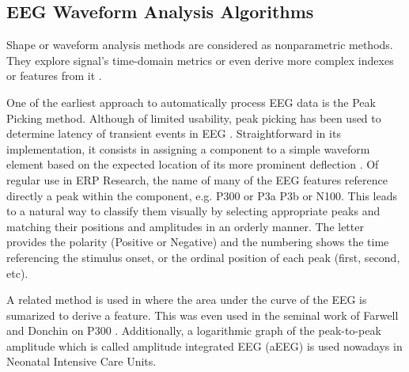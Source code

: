 \documentclass[brainsci,article,submit,moreauthors,pdftex,10pt,a4paper]{mdpi}
\begin{document}
\subsection{EEG Waveform Analysis Algorithms}
\label{Algorithms}

Shape or waveform analysis methods are considered as nonparametric methods.  They explore signal's time-domain metrics or even derive more complex indexes or features from it \citep{Thakor2009}. 

One of the earliest approach to automatically process EEG data is the Peak Picking method.  Although of limited usability, peak picking has been used to determine latency of transient events in EEG \citep{Jaskowski2000,Zhang2011}.  Straightforward in its implementation, it consists in assigning a component to a simple waveform element based on the expected location of its more prominent deflection \citep{Ouyang2017}.  
Of regular use in ERP Research, the name of many of the EEG features reference directly a peak within the component, e.g. P300 or P3a P3b or N100.  This leads to a natural way to classify them visually by selecting appropriate peaks and matching their positions and amplitudes in an orderly manner.  The letter provides the polarity (Positive or Negative) and the numbering shows the time referencing the stimulus onset, or the ordinal position of each peak (first, second, etc). 


A related method is used in \citep{Alvarado-Gonzalez2016} where the area under the curve of the EEG is sumarized to derive a feature.  This was even used in the seminal work of Farwell and Donchin on P300 \citep{Farwell1988,WolpawJonathanR2012}. Additionally, a logarithmic graph of the peak-to-peak amplitude which is called amplitude integrated EEG (aEEG) \citep{Shah2015} is used nowadays in Neonatal Intensive Care Units.
\end{document}
